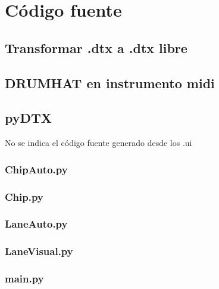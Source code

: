 \documentclass[a4paper,11pt,oneside]{book}
\begin{document}
\appendix


\chapter{Código fuente}
\section{Transformar .dtx a .dtx libre}



\section{DRUMHAT en instrumento midi}


\section{pyDTX}

No se indica el código fuente generado desde los .ui

\subsection{ChipAuto.py}



\subsection{Chip.py}



\subsection{LaneAuto.py}



\subsection{LaneVisual.py}



\subsection{main.py}
\end{document}
